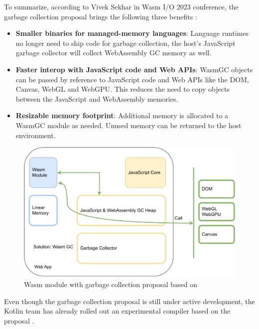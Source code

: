 To summarize, according to Vivek Sekhar in Wasm I/O 2023 conference, the garbage collection proposal brings the following three benefits \cite{sekhar_2023_mobile}:
%
\begin{itemize}
  \item \textbf{Smaller binaries for managed-memory languages}: Language runtimes no longer need to ship code for garbage collection, the host's JavaScript garbage collector will collect WebAssembly GC memory as well.
  \item \textbf{Faster interop with JavaScript code and Web APIs}: WasmGC objects can be passed by reference to JavaScript code and Web APIs like the DOM, Canvas, WebGL and WebGPU. This reduces the need to copy objects between the JavaScript and WebAssembly memories.
  \item \textbf{Resizable memory footprint}: Additional memory is allocated to a WasmGC module as needed. Unused memory can be returned to the host environment.
\end{itemize}
%
\begin{figure}[htbp]
  \centering
      \includegraphics[width=1\linewidth]{images/wasm/wasm_gc_2.drawio.pdf}
  \caption{Wasm module with garbage collection proposal based on \cite{sekhar_2023_mobile}}
  \label{fig:wasm-gc-2}
\end{figure}
%
Even though the garbage collection proposal is still under active development, the Kotlin team has already rolled out an experimental compiler based on the proposal \cite{kotlin_2023_kotlin}.
